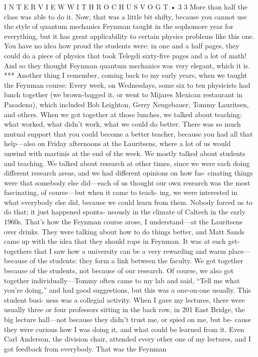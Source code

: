 \documentclass[10pt,oneside]{article}
\begin{document}
I N T E R V I E W  W I T H  R O C H U S  V O G T • 3 3 More than half the class was able to do it. Now, that was a little bit shifty, because you cannot use the style of quantum mechanics Feynman taught in the sophomore year for everything, but it has great applicability to certain physics problems like this one. You have no idea how proud the students were: in one and a half pages, they could do a piece of physics that took Telegdi sixty-five pages and a lot of math! And so they thought Feynman quantum mechanics was very elegant, which it is. *** Another thing I remember, coming back to my early years, when we taught the Feynman course: Every week, on Wednesdays, some six to ten physicists had lunch together (we brown-bagged it, or went to Mijares Mexican restaurant in Pasadena), which included Bob Leighton, Gerry Neugebauer, Tommy Lauritsen, and others. When we got together at those lunches, we talked about teaching: what worked, what didn’t work, what we could do better. There was so much mutual support that you could become a better teacher, because you had all that help---also on Friday afternoons at the Lauritsens, where a lot of us would unwind with martinis at the end of the week. We mostly talked about students and teaching. We talked about research at other times, since we were each doing different research areas, and we had different opinions on how fas- cinating things were that somebody else did---each of us thought our own research was the most fascinating, of course---but when it came to teach- ing, we were interested in what everybody else did, because we could learn from them. Nobody forced us to do that; it just happened sponta- neously in the climate of Caltech in the early 1960s. That’s how the Feynman course arose, I understand---at the Lauritsens over drinks. They were talking about how to do things better, and Matt Sands came up with the idea that they should rope in Feynman. It was at such get-togethers that I saw how a university can be a very rewarding and warm place---because of the students: they form a link between the faculty. We got together because of the students, not because of our research. Of course, we also got together individually---Tommy often came to my lab and said, “Tell me what you’re doing,” and had good suggestions, but this was a one-on-one usually. This student busi- ness was a collegial activity. When I gave my lectures, there were usually three or four professors sitting in the back row, in 201 East Bridge, the big lecture hall---not because they didn’t trust me, or spied on me, but be- cause they were curious how I was doing it, and what could be learned from it. Even Carl Anderson, the division chair, attended every other one of my lectures, and I got feedback from everybody. That was the Feynman\par
\end{document}
